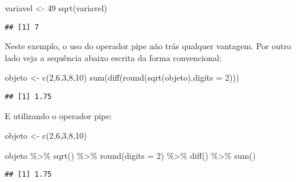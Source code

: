 \documentclass[
]{book}
\newenvironment{Shaded}{\begin{snugshade}}{\end{snugshade}}
\newcommand{\AttributeTok}[1]{\textcolor[rgb]{0.77,0.63,0.00}{#1}}
\newcommand{\DecValTok}[1]{\textcolor[rgb]{0.00,0.00,0.81}{#1}}
\newcommand{\FunctionTok}[1]{\textcolor[rgb]{0.00,0.00,0.00}{#1}}
\newcommand{\NormalTok}[1]{#1}
\newcommand{\OtherTok}[1]{\textcolor[rgb]{0.56,0.35,0.01}{#1}}
\newcommand{\SpecialCharTok}[1]{\textcolor[rgb]{0.00,0.00,0.00}{#1}}
\begin{document}
\begin{Shaded}
\begin{Highlighting}[]
\NormalTok{variavel }\OtherTok{\textless{}{-}} \DecValTok{49}
\FunctionTok{sqrt}\NormalTok{(variavel)}
\end{Highlighting}
\end{Shaded}

\begin{verbatim}
## [1] 7
\end{verbatim}

Neste exemplo, o uso do operador pipe não trás qualquer vantagem. Por outro lado veja a sequência abaixo escrita da forma convencional:

\begin{Shaded}
\begin{Highlighting}[]
\NormalTok{objeto }\OtherTok{\textless{}{-}} \FunctionTok{c}\NormalTok{(}\DecValTok{2}\NormalTok{,}\DecValTok{6}\NormalTok{,}\DecValTok{3}\NormalTok{,}\DecValTok{8}\NormalTok{,}\DecValTok{10}\NormalTok{)}
\FunctionTok{sum}\NormalTok{(}\FunctionTok{diff}\NormalTok{(}\FunctionTok{round}\NormalTok{(}\FunctionTok{sqrt}\NormalTok{(objeto),}\AttributeTok{digits =} \DecValTok{2}\NormalTok{)))}
\end{Highlighting}
\end{Shaded}

\begin{verbatim}
## [1] 1.75
\end{verbatim}

E utilizando o operador pipe:

\begin{Shaded}
\begin{Highlighting}[]
\NormalTok{objeto }\OtherTok{\textless{}{-}} \FunctionTok{c}\NormalTok{(}\DecValTok{2}\NormalTok{,}\DecValTok{6}\NormalTok{,}\DecValTok{3}\NormalTok{,}\DecValTok{8}\NormalTok{,}\DecValTok{10}\NormalTok{)}

\NormalTok{objeto }\SpecialCharTok{\%\textgreater{}\%} \FunctionTok{sqrt}\NormalTok{() }\SpecialCharTok{\%\textgreater{}\%} \FunctionTok{round}\NormalTok{(}\AttributeTok{digits =} \DecValTok{2}\NormalTok{) }\SpecialCharTok{\%\textgreater{}\%} \FunctionTok{diff}\NormalTok{() }\SpecialCharTok{\%\textgreater{}\%} \FunctionTok{sum}\NormalTok{()}
\end{Highlighting}
\end{Shaded}

\begin{verbatim}
## [1] 1.75
\end{verbatim}
\end{document}
